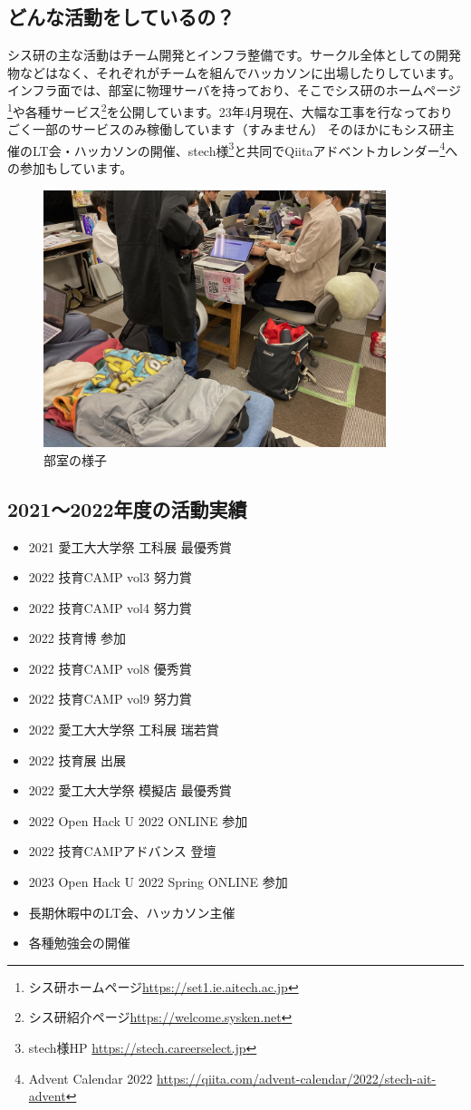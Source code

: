 \subsection{どんな活動をしているの？}
シス研の主な活動はチーム開発とインフラ整備です。サークル全体としての開発物などはなく、それぞれがチームを組んでハッカソンに出場したりしています。 \\
インフラ面では、部室に物理サーバを持っており、そこでシス研のホームページ\footnote{シス研ホームページ\url{https://set1.ie.aitech.ac.jp}}や各種サービス\footnote{シス研紹介ページ\url{https://welcome.sysken.net}}を公開しています。23年4月現在、大幅な工事を行なっておりごく一部のサービスのみ稼働しています（すみません）
そのほかにもシス研主催のLT会・ハッカソンの開催、stech様\footnote{stech様HP \url{https://stech.careerselect.jp}}と共同でQiitaアドベントカレンダー\footnote{Advent Calendar 2022 \url{https://qiita.com/advent-calendar/2022/stech-ait-advent}}への参加もしています。
\begin{figure}[bht]
  \centering
  \includegraphics[width=10cm]{./image/02-AboutSysken/room.jpg}
  \caption{部室の様子}
\end{figure}

\subsection{2021〜2022年度の活動実績}
\begin{itemize}
  \item 2021 愛工大大学祭 工科展 最優秀賞
  \item 2022 技育CAMP vol3 努力賞
  \item 2022 技育CAMP vol4 努力賞
  \item 2022 技育博 参加
  \item 2022 技育CAMP vol8 優秀賞
  \item 2022 技育CAMP vol9 努力賞
  \item 2022 愛工大大学祭 工科展 瑞若賞
  \item 2022 技育展 出展
  \item 2022 愛工大大学祭 模擬店 最優秀賞
  \item 2022 Open Hack U 2022 ONLINE 参加
  \item 2022 技育CAMPアドバンス 登壇
  \item 2023 Open Hack U 2022 Spring ONLINE 参加
  \item 長期休暇中のLT会、ハッカソン主催
  \item 各種勉強会の開催
\end{itemize}

